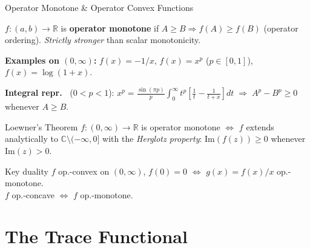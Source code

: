 \documentclass{beamer}
\begin{document}
\begin{frame}[shrink=10]{Operator Monotone \& Operator Convex Functions}
  \small
  \begin{tcolorbox}[defbox, title={Definition}, left=3pt, right=3pt, top=2pt, bottom=2pt]
    $f:(a,b)\to\mathbb{R}$ is \textbf{operator monotone} if
    $A\ge B \Rightarrow f(A)\ge f(B)$ (operator ordering).
    \emph{Strictly stronger} than scalar monotonicity.
  \end{tcolorbox}

  \textbf{Examples on $(0,\infty)$:} $f(x)=-1/x$,\; $f(x)=x^p$ ($p\in[0,1]$),\; $f(x)=\log(1+x)$.

  \begin{tcolorbox}[mathbox, left=3pt, right=3pt, top=1pt, bottom=1pt]
    \textbf{Integral repr.\ } ($0<p<1$):\;
    $x^p = \tfrac{\sin(\pi p)}{p}\int_0^\infty t^p\!\left[\tfrac{1}{t}-\tfrac{1}{t+x}\right]dt
    \;\Rightarrow\; A^p - B^p \ge 0$ whenever $A\ge B$.
  \end{tcolorbox}

  \begin{block}{Loewner's Theorem}
    $f:(0,\infty)\to\mathbb{R}$ is operator monotone $\Leftrightarrow$ $f$ extends
    analytically to $\mathbb{C}\setminus(-\infty,0]$ with the \emph{Herglotz property}:
    $\mathrm{Im}(f(z))\ge 0$ whenever $\mathrm{Im}(z)>0$.
  \end{block}

  \begin{alertblock}{Key duality}
    $f$ op.-convex on $(0,\infty)$, $f(0)=0$ $\Leftrightarrow$ $g(x)=f(x)/x$ op.-monotone.\\
    $f$ op.-concave $\Leftrightarrow$ $f$ op.-monotone.
  \end{alertblock}
\end{frame}

\section{The Trace Functional}
\end{document}
